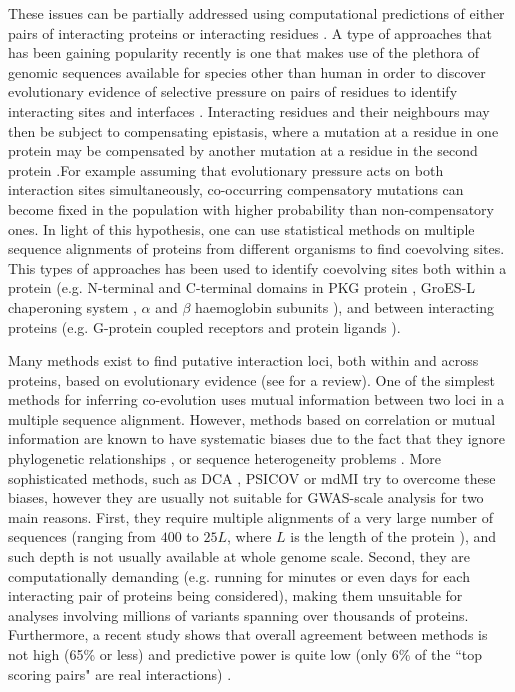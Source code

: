 These issues can be partially addressed using computational predictions of either pairs of interacting proteins or interacting residues \cite{shoemaker2007decipheringP2}. A type of approaches that has been gaining popularity recently is one that makes use of the plethora of genomic sequences available for species other than human in order to discover evolutionary evidence of selective pressure on pairs of residues to identify interacting sites and interfaces \cite{marks2012protein}. Interacting residues and their neighbours may then be subject to compensating epistasis, where a mutation at a residue in one protein may be compensated by another mutation at a residue in the second protein \cite{pazos1997correlated}.For example assuming that evolutionary pressure acts on both interaction sites simultaneously, co-occurring compensatory mutations can become fixed in the population with higher probability than non-compensatory ones. In light of this hypothesis, one can use statistical methods on multiple sequence alignments of proteins from different organisms to find coevolving sites. This types of approaches has been used to identify coevolving sites both within a protein (e.g. N-terminal and C-terminal domains in PKG protein \cite{goh2000co}, GroES-L chaperoning system \cite{ruiz2013coevolution}, $\alpha$ and $\beta$ haemoglobin subunits \cite{pazos1997correlated}), and between interacting proteins (e.g. G-protein coupled receptors and protein ligands \cite{goh2000co}).

Many methods exist to find putative interaction loci, both within and across proteins, based on evolutionary evidence (see \cite{de2013emerging} for a review). One of the simplest methods for inferring co-evolution uses mutual information between two loci \cite{marks2012protein} in a multiple sequence alignment. However, methods based on correlation or mutual information are known to have systematic biases due to the fact that they ignore phylogenetic relationships \cite{de2013emerging}, or sequence heterogeneity problems \cite{weigt2009identification}. More sophisticated methods, such as DCA \cite{morcos2011direct}, PSICOV \cite{jones2012psicov} or mdMI \cite{clark2014multidimensional} try to overcome these biases, however they are usually not suitable for GWAS-scale analysis for two main reasons. First, they require multiple alignments of a very large number of sequences (ranging from $400$ to $25L$, where $L$ is the length of the protein \cite{clark2014multidimensional}), and such depth is not usually available at whole genome scale. Second, they are computationally demanding (e.g. running for minutes or even days for each interacting pair of proteins being considered), making them unsuitable for analyses involving millions of variants spanning over thousands of proteins. Furthermore, a recent study shows that overall agreement between methods is not high (65\% or less) and predictive power is quite low (only 6\% of the ``top scoring pairs" are real interactions) \cite{clark2014multidimensional}.

